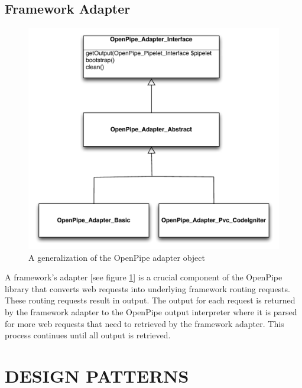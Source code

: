 \documentclass[12pt]{report}
\begin{document}
\section{Framework Adapter}

\begin{figure}[H]
\label{fig:generalizationAdapter}
\centering
\includegraphics[width=\textwidth,keepaspectratio]{figures/images/generalization_adapters.pdf}
\caption{A generalization of the OpenPipe adapter object}
\end{figure}

A framework's adapter [see figure \ref{fig:generalizationAdapter}]  is a crucial component of the OpenPipe library that converts web requests into underlying framework routing requests. These routing requests result in output. The output for each request is returned by the framework adapter to the OpenPipe output interpreter where it is parsed for more web requests that need to retrieved by the framework adapter. This process continues until all output is retrieved.





\chapter{DESIGN PATTERNS}
\end{document}

